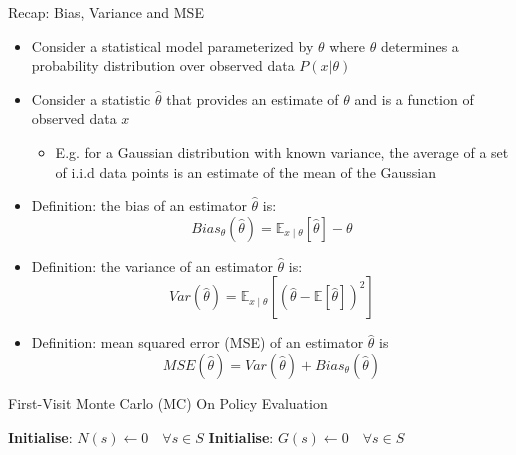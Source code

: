 \documentclass[aspectratio=169]{../latex_main/tntbeamer}  %
\begin{document}
\begin{frame}[c]{Recap: Bias, Variance and MSE}

\begin{itemize}
	\item Consider a statistical model parameterized by $\theta$ where $\theta$ determines
	a probability distribution over observed data $P(x|\theta)$
	\item Consider a statistic $\hat{\theta}$ that provides an estimate of $\theta$ and is a function of
	observed data $x$
	\begin{itemize}
		\item E.g. for a Gaussian distribution with known variance, the average of a set of
		i.i.d data points is an estimate of the mean of the Gaussian
	\end{itemize}
	\item Definition: the bias of an estimator $\hat{\theta}$ is:
	$$ Bias_{\theta} (\hat{\theta}) = \mathbb{E}_{x\mid \theta} [\hat{\theta}] - \theta$$
	\item Definition: the variance of an estimator $\hat{\theta}$ is:
	$$ Var (\hat{\theta}) = \mathbb{E}_{x\mid \theta} [(\hat{\theta} - \mathbb{E}[\hat{\theta}])^2] $$
	\item Definition: mean squared error (MSE) of an estimator $\hat{\theta}$ is
	$$MSE(\hat{\theta}) = Var(\hat{\theta})  + Bias_{\theta} (\hat{\theta}) $$
\end{itemize}

\end{frame}
\begin{frame}[c]{First-Visit Monte Carlo (MC) On Policy Evaluation}

\begin{algorithm}[H]
    \caption{First Visit Monte Carlo}
    \DontPrintSemicolon
    \LinesNotNumbered
    
    
    \textbf{Initialise}: $N(s) \gets 0 \quad \forall s \in S$ 
    \textbf{Initialise}: $G(s) \gets 0 \quad \forall s \in S$ 
\end{algorithm}
\end{frame}
\end{document}

